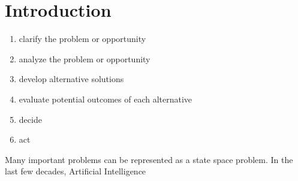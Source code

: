 \documentclass[a4paper,12pt]{article}
\begin{document}
\tableofcontents
\newpage

\section{Introduction}

\begin{enumerate}
\item clarify the problem or opportunity
\item analyze the problem or opportunity
\item develop alternative solutions
\item evaluate potential outcomes of each alternative
\item decide
\item act
\end{enumerate}



Many important problems can be represented as a state space problem. In the last few decades, Artificial Intelligence 

\end{document}
